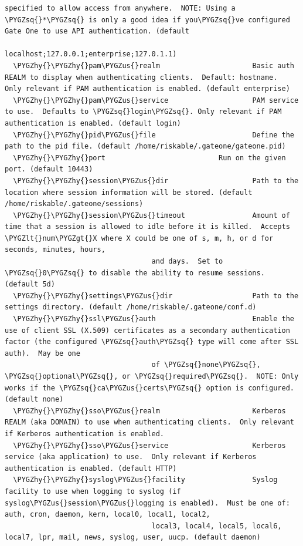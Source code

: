 \documentclass[letterpaper,10pt,openany]{sphinxmanual}
\def\PYGZus{\char`\_}
\def\PYGZlt{\char`\<}
\def\PYGZgt{\char`\>}
\def\PYGZhy{\char`\-}
\def\PYGZsq{\char`\'}
\begin{document}
\begin{Verbatim}[commandchars=\\\{\}]
                                   specified to allow access from anywhere.  NOTE: Using a \PYGZsq{}*\PYGZsq{} is only a good idea if you\PYGZsq{}ve configured Gate One to use API authentication. (default
                                   localhost;127.0.0.1;enterprise;127.0.1.1)
  \PYGZhy{}\PYGZhy{}pam\PYGZus{}realm                      Basic auth REALM to display when authenticating clients.  Default: hostname.  Only relevant if PAM authentication is enabled. (default enterprise)
  \PYGZhy{}\PYGZhy{}pam\PYGZus{}service                    PAM service to use.  Defaults to \PYGZsq{}login\PYGZsq{}. Only relevant if PAM authentication is enabled. (default login)
  \PYGZhy{}\PYGZhy{}pid\PYGZus{}file                       Define the path to the pid file. (default /home/riskable/.gateone/gateone.pid)
  \PYGZhy{}\PYGZhy{}port                           Run on the given port. (default 10443)
  \PYGZhy{}\PYGZhy{}session\PYGZus{}dir                    Path to the location where session information will be stored. (default /home/riskable/.gateone/sessions)
  \PYGZhy{}\PYGZhy{}session\PYGZus{}timeout                Amount of time that a session is allowed to idle before it is killed.  Accepts \PYGZlt{}num\PYGZgt{}X where X could be one of s, m, h, or d for seconds, minutes, hours,
                                   and days.  Set to \PYGZsq{}0\PYGZsq{} to disable the ability to resume sessions. (default 5d)
  \PYGZhy{}\PYGZhy{}settings\PYGZus{}dir                   Path to the settings directory. (default /home/riskable/.gateone/conf.d)
  \PYGZhy{}\PYGZhy{}ssl\PYGZus{}auth                       Enable the use of client SSL (X.509) certificates as a secondary authentication factor (the configured \PYGZsq{}auth\PYGZsq{} type will come after SSL auth).  May be one
                                   of \PYGZsq{}none\PYGZsq{}, \PYGZsq{}optional\PYGZsq{}, or \PYGZsq{}required\PYGZsq{}.  NOTE: Only works if the \PYGZsq{}ca\PYGZus{}certs\PYGZsq{} option is configured. (default none)
  \PYGZhy{}\PYGZhy{}sso\PYGZus{}realm                      Kerberos REALM (aka DOMAIN) to use when authenticating clients.  Only relevant if Kerberos authentication is enabled.
  \PYGZhy{}\PYGZhy{}sso\PYGZus{}service                    Kerberos service (aka application) to use.  Only relevant if Kerberos authentication is enabled. (default HTTP)
  \PYGZhy{}\PYGZhy{}syslog\PYGZus{}facility                Syslog facility to use when logging to syslog (if syslog\PYGZus{}session\PYGZus{}logging is enabled).  Must be one of: auth, cron, daemon, kern, local0, local1, local2,
                                   local3, local4, local5, local6, local7, lpr, mail, news, syslog, user, uucp. (default daemon)

\end{Verbatim}
\end{document}
